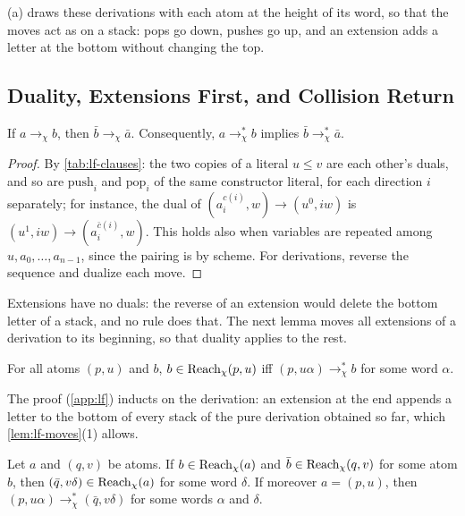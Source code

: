 (a) draws these derivations with each atom at the height of
its word, so that the moves act as on a stack: pops go down, pushes go up, and
an extension adds a letter at the bottom without changing the top.



\subsection{Duality, Extensions First, and Collision Return}\label{sec:lf-duality}

\begin{lemma}[Duality]\label{lem:lf-duality}
If $a\to_\chi b$, then $\bar b\to_\chi\bar a$. Consequently, $a\to^*_\chi b$
implies $\bar b\to^*_\chi\bar a$.
\end{lemma}

\begin{proof}
By \cref{tab:lf-clauses}: the two copies of a literal $u\le v$ are each
other's duals, and so are $\mathrm{push}_i$ and $\mathrm{pop}_i$ of the same
constructor literal, for each direction $i$ separately; for instance, the
dual of $(a_i^{c(i)},w)\to(u^0,iw)$ is $(u^1,iw)\to(a_i^{\bar c(i)},w)$.
This holds also when variables are repeated among $u,a_0,\dots,a_{n-1}$,
since the pairing is by scheme. For derivations, reverse the sequence and
dualize each move.
\end{proof}

Extensions have no duals: the reverse of an extension would delete the
bottom letter of a stack, and no rule does that. The next lemma moves all
extensions of a derivation to its beginning, so that duality applies to the
rest.

\begin{lemma}\label{lem:lf-ext-first}\label{lem:lf-extensions}
For all atoms $(p,u)$ and $b$, $b\in \operatorname{Reach}_\chi(p,u)$ iff
$(p,u\alpha)\to^*_\chi b$ for some word $\alpha$.
\end{lemma}

The proof (\cref{app:lf}) inducts on the derivation: an extension at the
end appends a letter to the bottom of every stack of the pure derivation
obtained so far, which \cref{lem:lf-moves}(1) allows.

\begin{lemma}\label{lem:lf-collision}
Let $a$ and $(q,v)$ be atoms. If $b\in \operatorname{Reach}_\chi(a)$ and $\bar b\in \operatorname{Reach}_\chi(q,v)$
for some atom $b$, then $(\bar q,v\delta)\in \operatorname{Reach}_\chi(a)$ for some word
$\delta$. If moreover $a=(p,u)$, then
$(p,u\alpha)\to^*_\chi(\bar q,v\delta)$ for some words $\alpha$ and $\delta$.
\end{lemma}

